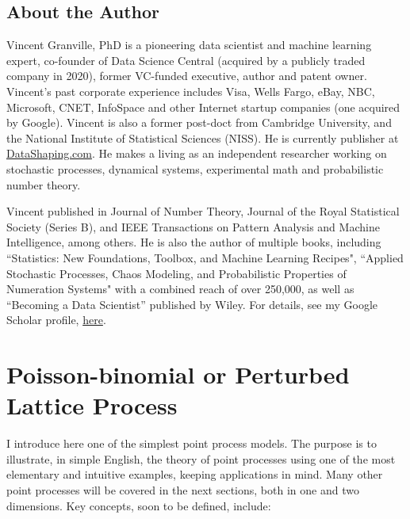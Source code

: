 \documentclass[10pt]{article}
\begin{document}
\subsection*{About the Author}\label{sec:vg}

Vincent Granville, PhD is a pioneering data scientist and machine learning expert, co-founder of Data Science Central (acquired by a publicly traded company in 2020), former VC-funded executive, author and patent owner. Vincent's past corporate experience includes Visa, Wells Fargo, eBay, NBC, Microsoft, CNET, InfoSpace and other Internet startup companies (one acquired by Google). Vincent is also a former post-doct from Cambridge University, and the National Institute of Statistical Sciences (NISS). He is currently publisher at \href{http://www.datashaping.com}{DataShaping.com}. He makes a living as an independent researcher working on stochastic processes, dynamical systems, experimental math and probabilistic number theory.

Vincent published in Journal of Number Theory, Journal of the Royal Statistical Society (Series B), and IEEE Transactions on Pattern Analysis and Machine Intelligence, among others. He is also the author of multiple  books, including ``Statistics: New Foundations, Toolbox, and Machine Learning Recipes", ``Applied Stochastic Processes, Chaos Modeling, and Probabilistic Properties of Numeration Systems" with a combined reach of over 250,000, as well as ``Becoming a Data Scientist'' published by Wiley.
For details, see my Google Scholar profile, \href{https://scholar.google.com/citations?user=pWFKWPMAAAAJ&hl=en}{here}.

\pagebreak

\section{Poisson-binomial or Perturbed Lattice Process}

I introduce here one of the simplest point process models. The purpose is to illustrate, in simple English, the theory of point processes using one of the most elementary and intuitive examples, keeping applications in mind. Many other point processes will be covered in the next sections, both in one and two dimensions. Key concepts, soon to be defined, include:
\vspace{1ex} \\
\end{document}
